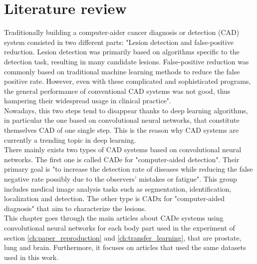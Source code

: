 
\chapter{Literature review}
\label{ch:literature_review}

Traditionally building a computer-aider cancer diagnosis or detection (CAD) system consisted in two different parts: "Lesion  detection  and  false-positive  reduction.  Lesion  detection  was  primarily  based  on  algorithms  specific  to  the  detection task, resulting in many candidate lesions. False-positive reduction was commonly based on traditional  machine  learning  methods  to  reduce  the  false  positive  rate. However,  even  with  these  complicated and sophisticated programs, the general performance of conventional CAD systems was not good, thus hampering their widespread usage in clinical practice"\cite{41}.\\
Nowadays, this two steps tend to disappear thanks to deep learning algorithms, in particular the one based on convolutional neural networks, that constitute themselves CAD of one single step. This is the reason why CAD systems are currently a trending topic in deep learning.\\
There mainly exists two types of CAD systems based on convolutional neural networks. The first one is called CADe for "computer-aided detection". Their primary goal is "to increase the detection rate of diseases while reducing the false negative  rate  possibly  due  to  the  observers’  mistakes  or  fatigue"\cite{41}. This group includes medical  image  analysis  tasks  such  as  segmentation,  identification,  localization  and  detection. The other type is CADx for "computer-aided diagnosis" that aim to characterize the lesions.\\
This chapter goes through the main articles about CADe systems using convolutional neural networks for each body part used in the experiment of section \ref{ch:paper_reproduction} and \ref{ch:transfer_learning}, that are prostate, lung and brain. Furthermore, it focuses on articles that used the same datasets used in this work.

